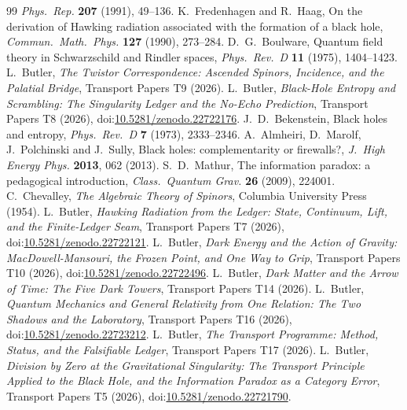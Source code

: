 \documentclass[11pt]{article}
\theoremstyle{definition}
\theoremstyle{plain}
\begin{document}
\begin{thebibliography}{99}
\emph{Phys.\ Rep.} \textbf{207} (1991), 49--136.
 K.~Fredenhagen and R.~Haag,
On the derivation of Hawking radiation associated with the formation of a black hole,
\emph{Commun.\ Math.\ Phys.} \textbf{127} (1990), 273--284.
 D.~G.~Boulware,
Quantum field theory in Schwarzschild and Rindler spaces,
\emph{Phys.\ Rev.\ D} \textbf{11} (1975), 1404--1423.
 L.~Butler,
\emph{The Twistor Correspondence: Ascended Spinors, Incidence, and the Palatial Bridge},
Transport Papers T9 (2026).
 L.~Butler,
\emph{Black-Hole Entropy and Scrambling: The Singularity Ledger and the No-Echo Prediction},
Transport Papers T8 (2026), doi:\href{https://doi.org/10.5281/zenodo.22722176}{10.5281/zenodo.22722176}.
 J.~D.~Bekenstein,
Black holes and entropy,
\emph{Phys.\ Rev.\ D} \textbf{7} (1973), 2333--2346.
 A.~Almheiri, D.~Marolf, J.~Polchinski and J.~Sully,
Black holes: complementarity or firewalls?,
\emph{J.\ High Energy Phys.} \textbf{2013}, 062 (2013).
 S.~D.~Mathur,
The information paradox: a pedagogical introduction,
\emph{Class.\ Quantum Grav.} \textbf{26} (2009), 224001.
 C.~Chevalley,
\emph{The Algebraic Theory of Spinors},
Columbia University Press (1954).
 L.~Butler,
\emph{Hawking Radiation from the Ledger: State, Continuum, Lift, and the Finite-Ledger Seam},
Transport Papers T7 (2026), doi:\href{https://doi.org/10.5281/zenodo.22722121}{10.5281/zenodo.22722121}.
 L.~Butler,
\emph{Dark Energy and the Action of Gravity: MacDowell-Mansouri, the Frozen Point, and One Way to Grip},
Transport Papers T10 (2026), doi:\href{https://doi.org/10.5281/zenodo.22722496}{10.5281/zenodo.22722496}.
 L.~Butler,
\emph{Dark Matter and the Arrow of Time: The Five Dark Towers},
Transport Papers T14 (2026).
 L.~Butler,
\emph{Quantum Mechanics and General Relativity from One Relation: The Two Shadows and the Laboratory},
Transport Papers T16 (2026), doi:\href{https://doi.org/10.5281/zenodo.22723212}{10.5281/zenodo.22723212}.
 L.~Butler,
\emph{The Transport Programme: Method, Status, and the Falsifiable Ledger},
Transport Papers T17 (2026).
 L.~Butler,
\emph{Division by Zero at the Gravitational Singularity: The Transport Principle Applied to the Black Hole, and the Information Paradox as a Category Error},
Transport Papers T5 (2026), doi:\href{https://doi.org/10.5281/zenodo.22721790}{10.5281/zenodo.22721790}.
\end{thebibliography}
\end{document}
